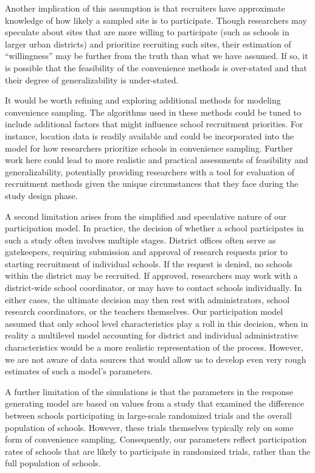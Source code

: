 \documentclass[
  man,floatsintext]{apa6}
\begin{document}
Another implication of this assumption is that recruiters have approximate knowledge of how likely a sampled site is to participate. Though researchers may speculate about sites that are more willing to participate (such as schools in larger urban districts) and prioritize recruiting such sites, their estimation of ``willingness'' may be further from the truth than what we have assumed. If so, it is possible that the feasibility of the convenience methods is over-stated and that their degree of generalizability is under-stated.

It would be worth refining and exploring additional methods for modeling convenience sampling. The algorithms used in these methods could be tuned to include additional factors that might influence school recruitment priorities. For instance, location data is readily available and could be incorporated into the model for how researchers prioritize schools in convenience sampling. Further work here could lead to more realistic and practical assessments of feasibility and generalizability, potentially providing researchers with a tool for evaluation of recruitment methods given the unique circumstances that they face during the study design phase.

A second limitation arises from the simplified and speculative nature of our participation model. In practice, the decision of whether a school participates in such a study often involves multiple stages. District offices often serve as gatekeepers, requiring submission and approval of research requests prior to starting recruitment of individual schools. If the request is denied, no schools within the district may be recruited. If approved, researchers may work with a district-wide school coordinator, or may have to contact schools individually. In either cases, the ultimate decision may then rest with administrators, school research coordinators, or the teachers themselves. Our participation model assumed that only school level characteristics play a roll in this decision, when in reality a multilevel model accounting for district and individual administrative characteristics would be a more realistic representation of the process. However, we are not aware of data sources that would allow us to develop even very rough estimates of such a model's parameters.

A further limitation of the simulations is that the parameters in the response generating model are based on values from a study that examined the difference between schools participating in large-scale randomized trials and the overall population of schools. However, these trials themselves typically rely on some form of convenience sampling. Consequently, our parameters reflect participation rates of schools that are likely to participate in randomized trials, rather than the full population of schools.
\end{document}
